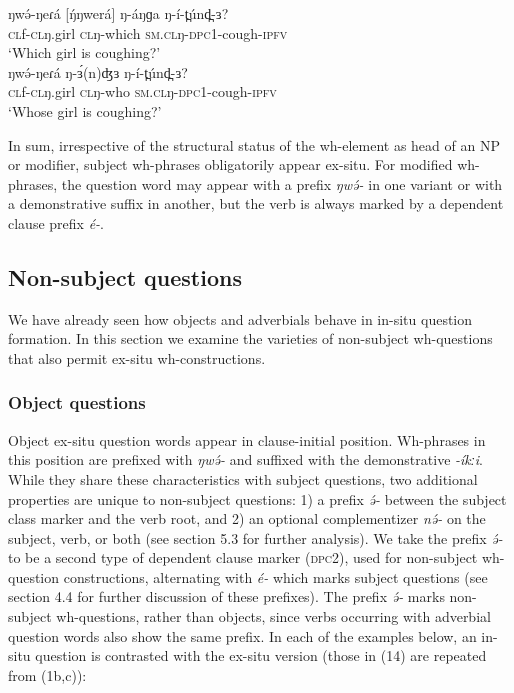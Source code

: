 \ea
\ea \gll	 	ŋwə́-ŋeɾá  [ŋ́ŋwerá]	ŋ-áŋɡa	ŋ-í-t̪únd̪-ɜ?\\
		\textsc{cl}f-\textsc{cl}ŋ.girl	\textsc{cl}ŋ-which	\textsc{sm.cl}ŋ-\textsc{dpc}1-cough-\textsc{ipfv}\\
\trans		‘Which girl is coughing?’\\
\ex \gll	ŋwə́-ŋeɾá	ŋ-ɜ́(n)ʤɜ	ŋ-í-t̪únd̪-ɜ?\\	            
		\textsc{cl}f-\textsc{cl}ŋ.girl	\textsc{cl}ŋ-who	\textsc{sm.cl}ŋ-\textsc{dpc}1-cough-\textsc{ipfv}\\
\trans		‘Whose girl is coughing?’\\
\z
\z

In sum, irrespective of the structural status of the wh-element as head of an NP or modifier, subject wh-phrases obligatorily appear ex-situ. For modified wh-phrases, the question word may appear with a prefix \textit{ŋwə́-} in one variant or with a demonstrative suffix in another, but the verb is always marked by a dependent clause prefix \textit{é-}. 

\subsection{Non-subject questions}

We have already seen how objects and adverbials behave in in-situ question formation. In this section we examine the varieties of non-subject wh-questions that also permit ex-situ wh-constructions. 

\subsubsection{Object questions}
Object ex-situ question words appear in clause-initial position. Wh-phrases in this position are prefixed with \textit{ŋwə́-} and suffixed with the demonstrative \textit{-íkːi}. While they share these characteristics with subject questions, two additional properties are unique to non-subject questions: 1) a prefix \textit{ə́-} between the subject class marker and the verb root, and 2) an optional complementizer \textit{nə́-} on the subject, verb, or both (see section 5.3 for further analysis). We take the prefix \textit{ə́-} to be a second type of dependent clause marker (\textsc{dpc}2), used for non-subject wh-question constructions, alternating with \textit{é-} which marks subject questions (see section 4.4 for further discussion of these prefixes). The prefix \textit{ə́-} marks non-subject wh-questions, rather than objects, since verbs occurring with adverbial question words also show the same prefix. In each of the examples below, an in-situ question is contrasted with the ex-situ version (those in (14) are repeated from (1b,c)): 

